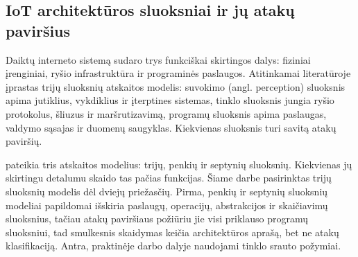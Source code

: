 %
%

\subsection{IoT architektūros sluoksniai ir jų atakų paviršius}
\label{sec:sluoksniai}

Daiktų interneto sistemą sudaro trys funkciškai skirtingos dalys:
fiziniai įrenginiai, ryšio infrastruktūra ir programinės
paslaugos. Atitinkamai literatūroje įprastas trijų sluoksnių atskaitos modelis:
suvokimo (angl. perception) sluoksnis apima jutiklius,
vykdiklius ir įterptines sistemas, tinklo sluoksnis jungia
ryšio protokolus, šliuzus ir maršrutizavimą, programų sluoksnis
apima paslaugas, valdymo sąsajas ir duomenų saugyklas. Kiekvienas sluoksnis
turi savitą atakų paviršių.

\citeauthor{krishna2021taxonomy} \cite{krishna2021taxonomy} pateikia
tris atskaitos modelius: trijų, penkių ir septynių sluoksnių.
Kiekvienas jų skirtingu detalumu skaido tas pačias funkcijas.
Šiame darbe pasirinktas trijų sluoksnių modelis dėl dviejų priežasčių.
Pirma, penkių ir septynių sluoksnių modeliai papildomai išskiria
paslaugų, operacijų, abstrakcijos ir skaičiavimų sluoksnius, tačiau
atakų paviršiaus požiūriu jie visi priklauso programų sluoksniui, tad
smulkesnis skaidymas keičia architektūros aprašą, bet ne atakų
klasifikaciją. Antra, praktinėje darbo dalyje naudojami tinklo srauto
požymiai.

